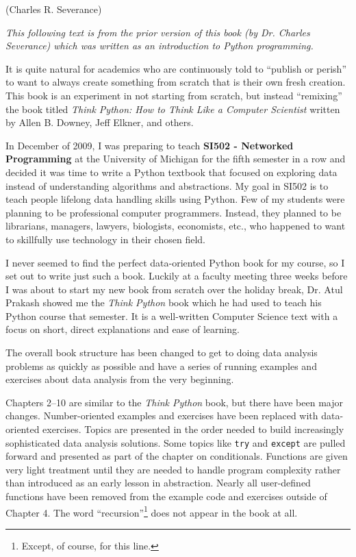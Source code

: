 (Charles R. Severance)

\textit{This following text is from the prior version of this book (by Dr. Charles Severance) which was written as an introduction to Python programming.}

It is quite natural for academics who are continuously told to 
``publish or perish'' to want to always create something from scratch
that is their own fresh creation.   This book is an 
experiment in not starting from scratch, but instead ``remixing''
the book titled
\emph{Think Python: How to Think Like
a Computer Scientist}
written by Allen B. Downey, Jeff Elkner, and others.

In December of 2009, I was preparing to teach
{\bf SI502 - Networked Programming} at the University of Michigan
for the fifth semester in a row and decided it was time
to write a Python textbook that focused on exploring data
instead of understanding algorithms and abstractions.
My goal in SI502 is to teach people lifelong data handling 
skills using Python.  Few of my
students were planning to be professional 
computer programmers.  Instead, they
planned to be librarians, managers, lawyers, biologists, economists, etc., 
who happened to want to skillfully use technology in their chosen field.

I never seemed to find the perfect data-oriented Python
book for my course, so I set out 
to write just such a book.  Luckily at a faculty meeting three weeks
before I was about to start my new book from scratch over 
the holiday break, 
Dr. Atul Prakash showed me the \emph{Think Python} book which he had
used to teach his Python course that semester.  
It is a well-written Computer Science text with a focus on 
short, direct explanations and ease of learning.  

The overall book structure
has been changed to get to doing data analysis problems as quickly as
possible and have a series of running examples and exercises 
about data analysis from the very beginning.  

Chapters 2--10 are similar to the \emph{Think Python} book,
but there have been major changes. Number-oriented examples and
exercises have been replaced with data-oriented exercises.
Topics are presented in the order needed to build increasingly
sophisticated data analysis solutions. Some topics like {\tt try} and
{\tt except} are pulled forward and presented as part of the chapter
on conditionals.  Functions are given very light treatment until 
they are needed to handle program complexity rather than introduced 
as an early lesson in abstraction.  Nearly all user-defined functions
have been removed from the example code and exercises outside of Chapter 4.
The word ``recursion''\footnote{Except, of course, for this line.}
does not appear in the book at all.

